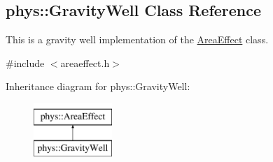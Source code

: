 \hypertarget{classphys_1_1GravityWell}{
\subsection{phys::GravityWell Class Reference}
\label{classphys_1_1GravityWell}
}


This is a gravity well implementation of the \hyperlink{classphys_1_1AreaEffect}{AreaEffect} class.  




{\ttfamily \#include $<$areaeffect.h$>$}

Inheritance diagram for phys::GravityWell:\begin{figure}[H]
\begin{center}
\leavevmode
\includegraphics[height=2.000000cm]{classphys_1_1GravityWell}
\end{center}
\end{figure}
